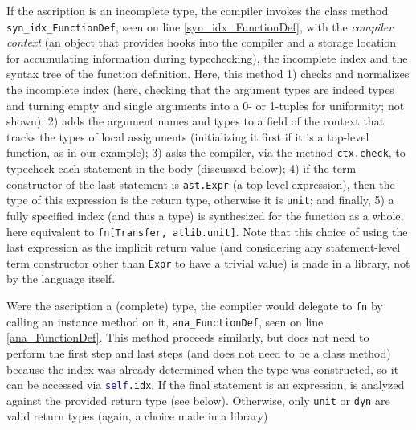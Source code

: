 \documentclass[9pt,preprint]{sigplanconf}
\newcommand{\lstinlinep}[1]{\lstinline[language=Python,basicstyle=\ttfamily\small]{#1}}
\begin{document}
If the ascription is an incomplete type, the compiler invokes the class method \lstinlinep{syn_idx_FunctionDef}, seen on line \ref{syn_idx_FunctionDef}, with the \emph{compiler context} (an object that provides hooks into the compiler and a storage location for accumulating information during typechecking), the incomplete index and the syntax tree of the function definition. Here, this method 1) checks and normalizes the incomplete index (here, checking that the argument types are indeed types and turning empty and single arguments into a 0- or 1-tuples for uniformity; not shown); 2) adds the argument names and types to a field of the context that tracks the types of local assignments (initializing it first if it is a top-level function, as in our example); 3) asks the compiler, via the method \lstinlinep{ctx.check}, to typecheck each statement in the body (discussed below); 4) if the term constructor of the last statement is \lstinlinep{ast.Expr} (a top-level expression), then the type of this expression is the return type, otherwise it is \lstinlinep{unit}; and finally, 5) a fully specified index (and thus a type) is synthesized for the function as a whole, here equivalent to \lstinlinep{fn[Transfer, atlib.unit]}. Note that this choice of using the last expression as the implicit return value (and considering any statement-level term constructor other than \lstinlinep{Expr} to have a trivial value) is made in a library, not by the language itself.%

Were the ascription a (complete) type, the compiler would delegate to \lstinlinep{fn} by calling an instance method on it, \lstinlinep{ana_FunctionDef}, seen on line \ref{ana_FunctionDef}. This method proceeds similarly, but does not need to perform the first step and last steps (and does not need to be a class method) because the index was already determined when the type was constructed, so it can be accessed via \lstinlinep{self.idx}. If the final statement is an expression, is analyzed against the provided return type (see below). Otherwise, only \lstinlinep{unit} or \lstinlinep{dyn} are valid return types (again, a choice made in a library)%
\end{document}
